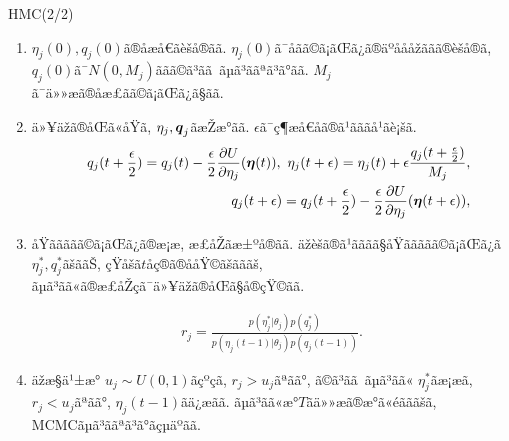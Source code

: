 \documentclass[dvipdfmx]{beamer} %
\newcommand{\bm}[1]{\mbox{\boldmath $#1$}}
\begin{document}
\begin{frame}{HMC(2/2)}

\begin{enumerate}

\item{}
$\eta_j(0), q_j(0)$ã®åæå€ãèš­å®ãã. $\eta_j(0)$ã¯åãã©ã¡ãŒã¿ã®äºåååžããã®èš­å®ã, $q_j(0)$ã¯$N(0,M_j)$ããã©ã³ãã ãµã³ããªã³ã°ãã. $M_j$ ã¯ä»»æã®åæ£ãã©ã¡ãŒã¿ã§ãã. 
 
\item{}

ä»¥äžã®åŒã«åŸã, $\eta_j, \bm q_j$ãæŽæ°ãã. $\epsilon$ã¯ç¶æå€åã®ã¹ãããå¹ãè¡šã.
\footnotesize
\begin{eqnarray*}
&&q_j(t+\frac{\epsilon}{2}) = q_j(t) - \frac{\epsilon}{2} \frac{\partial U}{\partial \eta_j} (\bm \eta(t)),\ 
\eta_j(t+\epsilon) = \eta_j(t) + \epsilon \frac{q_j(t + \frac{\epsilon}{2})}{M_j},\\ 
&&q_j(t+\epsilon) = q_j(t+\frac{\epsilon}{2}) - \frac{\epsilon}{2} \frac{\partial U}{\partial \eta_j} (\bm \eta(t + \epsilon)),
\end{eqnarray*}
\normalsize

\item{}
åŸããããã©ã¡ãŒã¿ã®æ¡æ, æ£åŽãæ±ºå®ãã. äžèšã®ã¹ãããã§åŸããããã©ã¡ãŒã¿ã$\eta^*_j, q^*_j$ãšããŠ,
çŸåšã$t$åç®ã®ååŸ©ãšãããš, ãµã³ãã«ã®æ£åŽçã¯ä»¥äžã®åŒã§å®çŸ©ãã.

\vspace{-0.5cm}
\begin{eqnarray*}
r_j = \frac{p(\eta^*_j|\theta_j) p(q^*_j)}{p(\eta_j(t-1)|\theta_j) p(q_j(t-1))}.
\end{eqnarray*}

\item{}
äžæ§ä¹±æ° $u_j \sim U(0,1)$ãçºçã, $r_j > u_j$ãªãã°, ã©ã³ãã ãµã³ãã« $\eta^*_j$ãæ¡æã, $r_j < u_j$ãªãã°, $\eta_j(t-1)$ãä¿æãã. ãµã³ãã«æ°$T$ãä»»æã®æ°ã«éãããšã, MCMCãµã³ããªã³ã°ãçµäºãã. 

\end{enumerate}

\end{frame}
\end{document}
